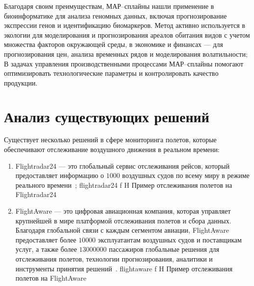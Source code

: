 Благодаря своим преимуществам, МАР--сплайны нашли применение в биоинформатике для анализа геномных данных, включая прогнозирование экспрессии генов и идентификацию биомаркеров.
Метод активно используется в экологии для моделирования и прогнозирования ареалов обитания видов с учетом множества факторов окружающей среды, в экономике и финансах --- для прогнозирования цен, анализа временных рядов и моделирования волатильности;
В задачах управления производственными процессами МАР--сплайны помогают оптимизировать технологические параметры и контролировать качество продукции.





\section{Анализ существующих решений}

Существует несколько решений в сфере мониторинга полетов, которые обеспечивают отслеживание воздушного движения в реальном времени:
\begin{enumerate}[label=\arabic*)]
    \item Flightradar24 --- это глобальный сервис отслеживания рейсов, который предоставляет информацию о $1000$ воздушных судов по всему миру в режиме реального времени~\cite{flightradar24};
        {flightradar24}
        {f}
        {H}
        {\textwidth}
        {Пример отслеживания полетов на Flightradar24}
    \item FlightAware --- это цифровая авиационная компания, которая управляет крупнейшей в мире платформой отслеживания полетов и сбора данных.
    Благодаря глобальной связи с каждым сегментом авиации, FlightAware предоставляет более $10 000$ эксплуатантам воздушных судов и поставщикам услуг, а также более $13 000 000$ пассажиров глобальные решения для отслеживания полетов, технологии прогнозирования, аналитики и инструменты принятия решений~\cite{flightaware}.
        {flightaware}
        {f}
        {H}
        {\textwidth}
        {Пример отслеживания полетов на FlightAware}
\end{enumerate}

